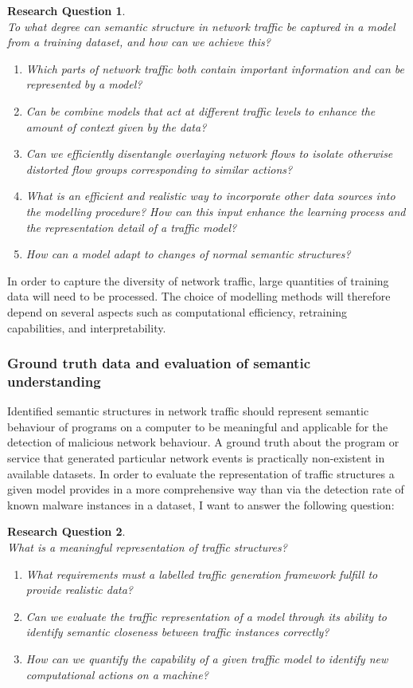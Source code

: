 \documentclass[a4paper,12pt,twoside]{report}
\newtheorem{rquestion}{Research Question}
\begin{document}
\begin{rquestion}\ \\
To what degree can semantic structure in network traffic be captured in a model from a training dataset, and how can we achieve this?
\begin{enumerate}
\item Which parts of network traffic both contain important information and can be represented by a model?
\item Can be combine models that act at different traffic levels to enhance the amount of context given by the data? 
\item Can we efficiently disentangle overlaying network flows to isolate otherwise distorted flow groups corresponding to similar actions? 
\item What is an efficient and realistic way to incorporate other data sources into the modelling procedure? How can this input enhance the learning process and the representation detail of a traffic model? 
\item How can a model adapt to changes of normal semantic structures?
\end{enumerate}
\end{rquestion}

In order to capture the diversity of network traffic, large quantities of training data will need to be processed. The choice of modelling methods will therefore depend on several aspects such as computational efficiency, retraining capabilities, and interpretability.

\subsubsection{Ground truth data and evaluation of semantic understanding}

Identified semantic structures in network traffic should represent semantic behaviour of programs on a computer to be meaningful and applicable for the detection of malicious network behaviour. A ground truth about the program or service that generated particular network events is practically non-existent in available datasets. In order to evaluate the representation of traffic structures a given model provides in a more comprehensive way than via the detection rate of known malware instances in a dataset, I want to answer the following question:

\begin{rquestion}\ \\
What is a meaningful representation of traffic structures?
\begin{enumerate}
\item What requirements must a labelled traffic generation framework fulfill to provide realistic data?
\item Can we evaluate the traffic representation of a model through its ability to identify semantic closeness between traffic instances correctly?
\item How can we quantify the capability of a given traffic model to identify new computational actions on a machine?
\end{enumerate}
\end{rquestion}
\end{document}
